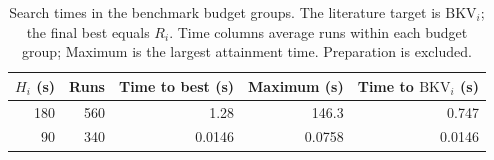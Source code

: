 \begin{table}[tbp]
\centering\small
\caption{Search times in the benchmark budget groups. The literature target is $\mathrm{BKV}_i$; the final best equals $R_i$. Time columns average runs within each budget group; Maximum is the largest attainment time. Preparation is excluded.}
\label{tab:timing-cohorts}
\begin{tabular}{rrrrr}
\toprule
$H_i$ (s) & Runs & Time to best (s) & Maximum (s) & Time to $\mathrm{BKV}_i$ (s)\\
\midrule
180 & 560 & 1.28 & 146.3 & 0.747\\
90 & 340 & 0.0146 & 0.0758 & 0.0146\\
\bottomrule\end{tabular}
\end{table}

